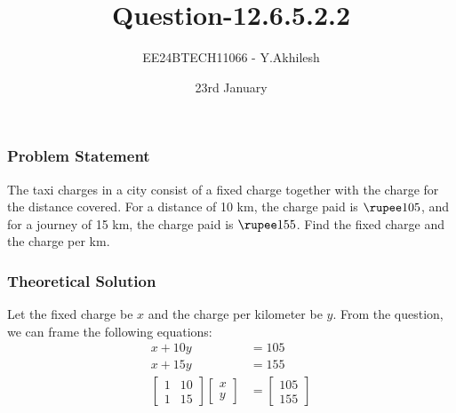 \documentclass{beamer}
\begin{document}
\title{Question-12.6.5.2.2}
\author{EE24BTECH11066 - Y.Akhilesh}
\date{23rd January}
\frame{\titlepage}

\begin{frame}
\frametitle{Problem Statement}
The taxi charges in a city consist of a fixed charge together with the charge for the distance covered. For a distance of 10 km, the charge paid is \( \text{\rupee} 105 \), and for a journey of 15 km, the charge paid is \( \text{\rupee} 155 \). Find the fixed charge and the charge per km. \\
\end{frame}

\begin{frame}
\frametitle{Theoretical Solution}
Let the fixed charge be \( x \) and the charge per kilometer be \( y \). From the question, we can frame the following equations:\newline
\begin{align}
    x + 10y &= 105 \\
    x + 15y &= 155 \\
    \begin{bmatrix}1 & 10\\1 & 15\end{bmatrix}\begin{bmatrix}x\\y\end{bmatrix} &= \begin{bmatrix}105\\155\end{bmatrix}
\end{align}
\end{frame}
\end{document}
